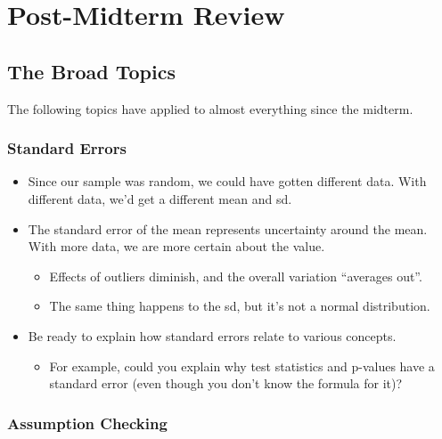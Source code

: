 \documentclass[
  letterpaper,
  DIV=11,
  numbers=noendperiod,
  oneside]{scrreprt}
\providecommand{\tightlist}{%
  \setlength{\itemsep}{0pt}\setlength{\parskip}{0pt}}\usepackage{longtable,booktabs,array}
\begin{document}
\hypertarget{post-midterm-review}{%
\chapter{Post-Midterm Review}\label{post-midterm-review}}

\hypertarget{the-broad-topics}{%
\section{The Broad Topics}\label{the-broad-topics}}

The following topics have applied to almost everything since the
midterm.

\hypertarget{standard-errors}{%
\subsection{Standard Errors}\label{standard-errors}}

\begin{itemize}
\tightlist
\item
  Since our sample was random, we could have gotten different data. With
  different data, we'd get a different mean and sd.
\item
  The standard error of the mean represents uncertainty around the mean.
  With more data, we are more certain about the value.

  \begin{itemize}
  \tightlist
  \item
    Effects of outliers diminish, and the overall variation ``averages
    out''.
  \item
    The same thing happens to the sd, but it's not a normal
    distribution.
  \end{itemize}
\item
  Be ready to explain how standard errors relate to various concepts.

  \begin{itemize}
  \tightlist
  \item
    For example, could you explain why test statistics and p-values have
    a standard error (even though you don't know the formula for it)?
  \end{itemize}
\end{itemize}

\hypertarget{assumption-checking-1}{%
\subsection{Assumption Checking}\label{assumption-checking-1}}
\end{document}
